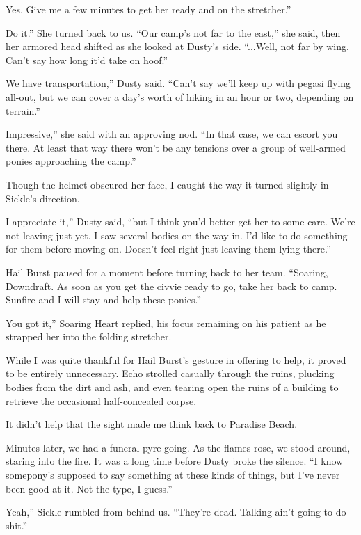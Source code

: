 \leavevmode{}Yes. Give me a few minutes to get her ready and on the stretcher.”

\leavevmode{}Do it.” She turned back to us. “Our camp’s not far to the east,” she said, then her armored head shifted as she looked at Dusty’s side. “...Well, not far by wing. Can’t say how long it’d take on hoof.”

\leavevmode{}We have transportation,” Dusty said. “Can’t say we’ll keep up with pegasi flying all-out, but we can cover a day’s worth of hiking in an hour or two, depending on terrain.”

\leavevmode{}Impressive,” she said with an approving nod. “In that case, we can escort you there. At least that way there won’t be any tensions over a group of well-armed ponies approaching the camp.”

Though the helmet obscured her face, I caught the way it turned slightly in Sickle’s direction.

\leavevmode{}I appreciate it,” Dusty said, “but I think you’d better get her to some care. We’re not leaving just yet. I saw several bodies on the way in. I’d like to do something for them before moving on. Doesn’t feel right just leaving them lying there.”

Hail Burst paused for a moment before turning back to her team. “Soaring, Downdraft. As soon as you get the civvie ready to go, take her back to camp. Sunfire and I will stay and help these ponies.”

\leavevmode{}You got it,” Soaring Heart replied, his focus remaining on his patient as he strapped her into the folding stretcher.

While I was quite thankful for Hail Burst’s gesture in offering to help, it proved to be entirely unnecessary. Echo strolled casually through the ruins, plucking bodies from the dirt and ash, and even tearing open the ruins of a building to retrieve the occasional half-concealed corpse.

It didn’t help that the sight made me think back to Paradise Beach.

Minutes later, we had a funeral pyre going. As the flames rose, we stood around, staring into the fire. It was a long time before Dusty broke the silence. “I know somepony’s supposed to say something at these kinds of things, but I’ve never been good at it. Not the type, I guess.”

\leavevmode{}Yeah,” Sickle rumbled from behind us. “They’re dead. Talking ain’t going to do shit.”

